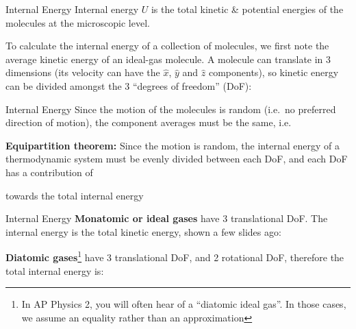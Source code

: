 \documentclass[12pt,aspectratio=169,dvipsnames]{beamer}
\begin{document}
\begin{frame}{Internal Energy}
  Internal energy {\color{OrangeRed}$U$} is the total kinetic \& potential
  energies of the molecules at the microscopic level.


  \vspace{-.05in}To calculate the internal energy of a collection of molecules,
  we first note the average kinetic energy of an ideal-gas molecule. A molecule
  can translate in 3 dimensions (its velocity can have the $\hat x$, $\hat y$
  and $\hat z$ components), so kinetic energy can be divided amongst the 3
  ``degrees of freedom'' (DoF):

  \vspace{-.2in}{\large
    \begin{align*}
      \langle K \rangle&=\frac12m\langle v^2\rangle
      =\frac12m\langle v_x^2+v_y^2+v_z^2\rangle\\
      &=\frac12m\langle v_x^2\rangle+\frac12m\langle v_y^2\rangle+
      \frac12m\langle v_z^2\rangle
    \end{align*}
  }
\end{frame}



\begin{frame}{Internal Energy}
  Since the motion of the molecules is random (i.e.\ no preferred direction of
  motion), the component averages must be the same, i.e.


  \vspace{-.1in}\textbf{Equipartition theorem:} Since the motion is random, the
  internal energy of a thermodynamic system must be evenly divided between each
  DoF, and each DoF has a contribution of

  
  \vspace{-.1in}towards the total internal energy
\end{frame}



\begin{frame}{Internal Energy}
  \textbf{Monatomic or ideal gases} have 3 translational DoF. The internal
  energy is the total kinetic energy, shown a few slides ago:
  

  \textbf{Diatomic gases}\footnote{In
  AP Physics 2, you will often hear of a ``diatomic ideal gas''. In those
  cases, we assume an equality rather than an approximation} have 3
  translational DoF, and 2 rotational DoF, therefore the total internal energy
  is:
    
  \vspace{.2in}
\end{frame}
\end{document}

